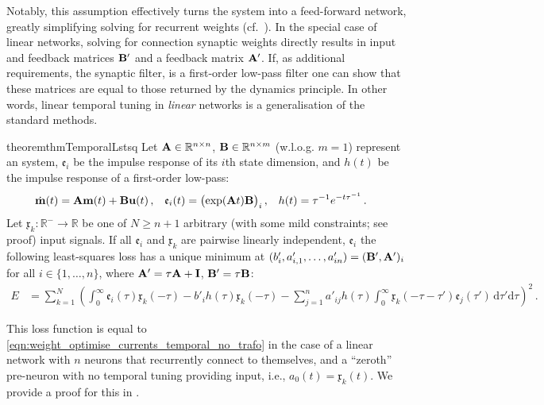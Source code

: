 Notably, this assumption effectively turns the system into a feed-forward network, greatly simplifying solving for recurrent weights (cf.~).
In the special case of linear networks, solving for connection synaptic weights directly results in input and feedback matrices $\mathbf{B}'$ and a feedback matrix $\mathbf{A}'$.
If, as additional requirements, the synaptic filter, is a first-order low-pass filter one can show that these matrices are equal to those returned by the \NEF dynamics principle.
In other words, linear temporal tuning in \emph{linear} networks is a generalisation of the standard \NEF methods.

\begin{restatable}{theorem}{thmTemporalLstsq}
	\label{thm:temporal_lstsq}
	Let $\mathbf{A} \in \mathbb{R}^{n \times n}$, $\mathbf{B} \in \mathbb{R}^{n \times m}$ (w.l.o.g. $m = 1$) represent an \LTI system, $\mathfrak{e}_i$ be the impulse response of its $i$th state dimension, and $h(t)$ be the impulse response of a first-order low-pass:
	\begin{align*}
		  \dot{\mathbf{m}}(t) &= \mathbf{A} \mathbf{m}(t) + \mathbf{B} \mathbf{u}(t)  \,, 
		& \mathfrak{e}_i(t) &= \big(\!\exp( \mathbf{A} t ) \mathbf{B} \big)_i \,,
		& h(t) &= \tau^{-1} e^{-t \tau^{-1}} \,.
	\end{align*}
	Let $\mathfrak{x}_k : \mathbb{R}^- \to \mathbb{R}$ be one of $N \geq n + 1$ arbitrary (with some mild constraints; see proof) input signals.
	If all $\mathfrak{e}_i$ and $\mathfrak{x}_k$ are pairwise linearly independent, $\mathfrak{e}_i$ the following least-squares loss has a unique minimum at $(b'_{i}, a'_{i, 1}, \ldots, a'_{in}) = ( \mathbf{B}', \mathbf{A}' )_i$ for all $i \in \{1, \ldots, n\}$, where $\mathbf{A}' = \tau \mathbf{A} + \mathbf{I}$, $\mathbf{B}' = \tau \mathbf{B}$:
	\begin{align*}
		E &=\sum_{k = 1}^{N} \left(
					\int_{0}^{\infty} \!\! \mathfrak{e}_i(\tau) \mathfrak{x}_k(-\tau)
		          - b'_{i} h(\tau) \mathfrak{x}_k(-\tau)
		          - \sum_{j=1}^n a'_{ij} h(\tau) \int_0^\infty \!\! \mathfrak{x}_k(-\tau - \tau') \mathfrak{e}_j(\tau') \, \mathrm{d}\tau' \mathrm{d}\tau \right)^2 \,.
	\end{align*}
\end{restatable}
\noindent This loss function is equal to \cref{eqn:weight_optimise_currents_temporal_no_trafo} in the case of a linear network with $n$ neurons that recurrently connect to themselves, and a \enquote{zeroth} pre-neuron with no temporal tuning providing input, i.e., $a_0(t) = \mathfrak{x}_k(t)$.
We provide a proof for this in .

